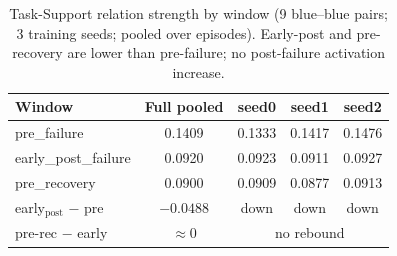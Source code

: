 \begin{table}[t]
\centering
\small
\caption{Task-Support relation strength by window (9 blue--blue pairs; 3 training seeds; pooled over episodes). Early-post and pre-recovery are lower than pre-failure; no post-failure activation increase.}
\label{tab:s1_ts_windows}
\begin{tabular}{lcccc}
\toprule
Window & Full pooled & seed0 & seed1 & seed2 \\
\midrule
pre_failure & 0.1409 & 0.1333 & 0.1417 & 0.1476 \\
early_post_failure & 0.0920 & 0.0923 & 0.0911 & 0.0927 \\
pre_recovery & 0.0900 & 0.0909 & 0.0877 & 0.0913 \\
\midrule
early$_\text{post}$ $-$ pre & $-0.0488$ & down & down & down \\
pre-rec $-$ early & $\approx 0$ & \multicolumn{3}{c}{no rebound} \\
\bottomrule
\end{tabular}
\end{table}